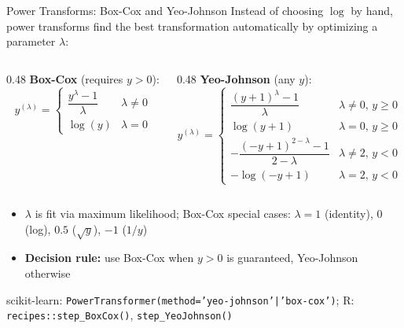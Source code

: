 \documentclass[11pt,compress,t,notes=noshow, xcolor=table]{beamer}
\begin{document}
\begin{vbframe}{Power Transforms: Box-Cox and Yeo-Johnson}
\vfill
Instead of choosing $\log$ by hand, power transforms find the best transformation automatically by optimizing a parameter $\lambda$:
\vfill
\begin{columns}[T]
\begin{column}{0.48\textwidth}
\textbf{Box-Cox} (requires $y > 0$):
$$y^{(\lambda)} = \begin{cases}
\dfrac{y^\lambda - 1}{\lambda} & \lambda \neq 0 \\[6pt]
\log(y) & \lambda = 0
\end{cases}$$
\end{column}
\begin{column}{0.48\textwidth}
\textbf{Yeo-Johnson} (any $y$):
\scriptsize
$$y^{(\lambda)} = \begin{cases}
\dfrac{(y{+}1)^\lambda - 1}{\lambda} & \lambda \neq 0,\, y \geq 0 \\[2pt]
\log(y{+}1) & \lambda = 0,\, y \geq 0 \\[2pt]
-\dfrac{(-y{+}1)^{2-\lambda} - 1}{2-\lambda} & \lambda \neq 2,\, y < 0 \\[2pt]
-\log(-y{+}1) & \lambda = 2,\, y < 0
\end{cases}$$
\normalsize
\end{column}
\end{columns}
\begin{itemize}\setlength{\itemsep}{2pt}
    \item $\lambda$ is fit via maximum likelihood; Box-Cox special cases: $\lambda=1$ (identity), $0$ (log), $0.5$ ($\sqrt{y}$), $-1$ ($1/y$)
    \item \textbf{Decision rule:} use Box-Cox when $y > 0$ is guaranteed, Yeo-Johnson otherwise
\end{itemize}
\footnotesize
scikit-learn: \texttt{PowerTransformer(method='yeo-johnson'|'box-cox')}; R: \texttt{recipes::step\_BoxCox()}, \texttt{step\_YeoJohnson()}
\end{vbframe}
\end{document}
